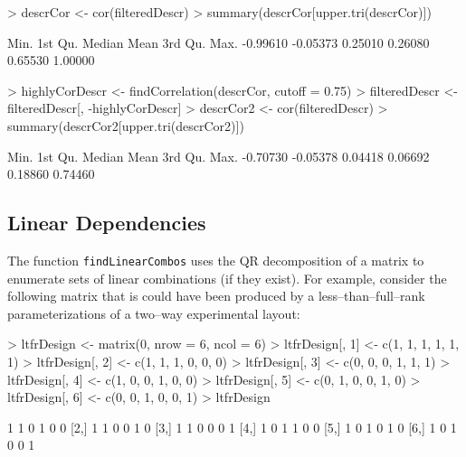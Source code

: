 \documentclass[12pt]{article}
\begin{document}
\begin{small}
\begin{Schunk}
\begin{Sinput}
> descrCor <- cor(filteredDescr)
> summary(descrCor[upper.tri(descrCor)])
\end{Sinput}
\begin{Soutput}
    Min.  1st Qu.   Median     Mean  3rd Qu.     Max. 
-0.99610 -0.05373  0.25010  0.26080  0.65530  1.00000 
\end{Soutput}
\begin{Sinput}
> highlyCorDescr <- findCorrelation(descrCor, cutoff = 0.75)
> filteredDescr <- filteredDescr[, -highlyCorDescr]
> descrCor2 <- cor(filteredDescr)
> summary(descrCor2[upper.tri(descrCor2)])
\end{Sinput}
\begin{Soutput}
    Min.  1st Qu.   Median     Mean  3rd Qu.     Max. 
-0.70730 -0.05378  0.04418  0.06692  0.18860  0.74460 
\end{Soutput}
\end{Schunk}
\end{small}

\subsection{Linear Dependencies}

The function \texttt{findLinearCombos} uses the QR decomposition of a matrix to enumerate sets of linear combinations (if they exist). For example, consider the following matrix that is could have been produced by a less--than--full--rank parameterizations of a two--way experimental layout:

\begin{small}
\begin{Schunk}
\begin{Sinput}
> ltfrDesign <- matrix(0, nrow = 6, ncol = 6)
> ltfrDesign[, 1] <- c(1, 1, 1, 1, 1, 1)
> ltfrDesign[, 2] <- c(1, 1, 1, 0, 0, 0)
> ltfrDesign[, 3] <- c(0, 0, 0, 1, 1, 1)
> ltfrDesign[, 4] <- c(1, 0, 0, 1, 0, 0)
> ltfrDesign[, 5] <- c(0, 1, 0, 0, 1, 0)
> ltfrDesign[, 6] <- c(0, 0, 1, 0, 0, 1)
> ltfrDesign
\end{Sinput}
\begin{Soutput}
     [,1] [,2] [,3] [,4] [,5] [,6]
[1,]    1    1    0    1    0    0
[2,]    1    1    0    0    1    0
[3,]    1    1    0    0    0    1
[4,]    1    0    1    1    0    0
[5,]    1    0    1    0    1    0
[6,]    1    0    1    0    0    1
\end{Soutput}
\end{Schunk}
\end{small}
\end{document}
